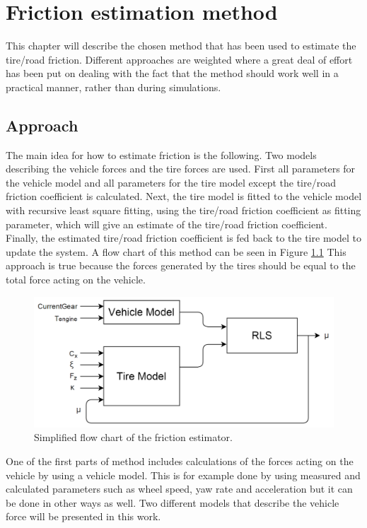 \chapter{Friction estimation method}

This chapter will describe the chosen method that has been used to estimate the tire/road friction. Different approaches are weighted where a great deal of effort has been put on dealing with the fact that the method should work well in a practical manner, rather than during simulations.

\section{Approach}
The main idea for how to estimate friction is the following. Two models describing the vehicle forces and the tire forces are used. First all parameters for the vehicle model and all parameters for the tire model except the tire/road friction coefficient is calculated. Next, the tire model is fitted to the vehicle model with recursive least square fitting, using the tire/road friction coefficient as fitting parameter, which will give an estimate of the tire/road friction coefficient. Finally, the estimated tire/road friction coefficient is fed back to the tire model to update the system. A flow chart of this method can be seen in Figure \ref{friction_estimator} This approach is true because the forces generated by the tires should be equal to the total force acting on the vehicle.

\begin{figure}[h]
	\centering
	\includegraphics[width=1.0\textwidth]{Pictures/friction_estimator}
	\caption {Simplified flow chart of the friction estimator. }
	\label{friction_estimator}
\end{figure}

One of the first parts of method includes calculations of the forces acting on the vehicle by using a vehicle model. This is for example done by using measured and calculated parameters such as wheel speed, yaw rate and acceleration but it can be done in other ways as well. Two different models that describe the vehicle force will be presented in this work. 

